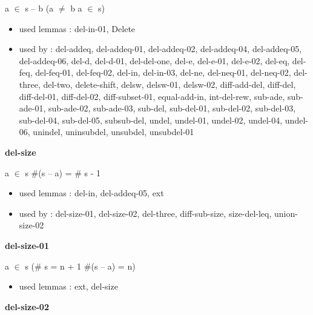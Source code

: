 \documentclass[a4paper]{article}
\begin{document}
 \Fol a $\in$ s -- b \Equiv \Not \Not (a $\neq$ b \And a $\in$ s)

\begin{itemize}


\item       used lemmas  : del-in-01, Delete
\item       used by      : del-addeq, del-addeq-01, del-addeq-02, del-addeq-04, del-addeq-05, del-addeq-06, del-d, del-d-01, del-del-one, del-e, del-e-01, del-e-02, del-eq, del-feq, del-feq-01, del-feq-02, del-in, del-in-03, del-ne, del-neq-01, del-neq-02, del-three, del-two, delete-shift, delsw, delsw-01, delsw-02, diff-add-del, diff-del, diff-del-01, diff-del-02, diff-subset-01, equal-add-in, int-del-rew, sub-ade, sub-ade-01, sub-ade-02, sub-ade-03, sub-del, sub-del-01, sub-del-02, sub-del-03, sub-del-04, sub-del-05, subsub-del, undel, undel-01, undel-02, undel-04, undel-06, unindel, uninsubdel, unsubdel, unsubdel-01

\end{itemize}

\medskip

\bigskip

{\large\bf del-size}

\medskip

 \Fol a $\in$ s \Imp \#(s -- a) = \# s - 1

\begin{itemize}


\item       used lemmas  : del-in, del-addeq-05, ext
\item       used by      : del-size-01, del-size-02, del-three, diff-sub-size, size-del-leq, union-size-02

\end{itemize}

\medskip

\bigskip

{\large\bf del-size-01}

\medskip

 \Fol a $\in$ s \Imp (\# s = n + 1 \Equiv \#(s -- a) = n)

\begin{itemize}


\item       used lemmas  : ext, del-size

\end{itemize}

\medskip

\bigskip

{\large\bf del-size-02}
\end{document}
